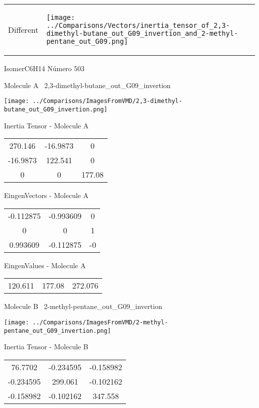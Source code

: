 \vtab[-5mm]
\begin{tabular}{*{2}{m{}}}
\begin{center}
\textcolor{NavyBlue}{\Large Different}
\end{center}
&
\begin{center}
\texttt{[image: ../Comparisons/Vectors/inertia\_tensor\_of\_2,3-dimethyl-butane\_out\_G09\_invertion\_and\_2-methyl-pentane\_out\_G09.png]}
\end{center}
\end{tabular}

 \newpage

\vtab[-3cm]
\begin{center}
{\large IsomerC6H14 \tab Número 503}
\end{center}
\begin{multicols}{2}
\begin{center}

Molecule A \
2,3-dimethyl-butane\_out\_G09\_invertion

\texttt{[image: ../Comparisons/ImagesFromVMD/2,3-dimethyl-butane\_out\_G09\_invertion.png]}

Inertia Tensor - Molecule A \\
\begin{tabular}{|c c c|}
270.146	 & 	-16.9873	 & 	0	 \\
-16.9873	 & 	122.541	 & 	0	 \\
0	 & 	0	 & 	177.08
\end{tabular}

\vtab
 EingenVectors - Molecule A     \\
\begin{tabular}{|c c c|}
-0.112875	 & 	-0.993609	 & 	0	 \\
0	 & 	0	 & 	1	 \\
0.993609	 & 	-0.112875	 & 	-0
\end{tabular}

\vtab
 EingenValues - Molecule A     \\
\begin{tabular}{|c c c|}
120.611	 & 	177.08	 & 	272.076	 \\
\end{tabular}
\columnbreak

Molecule B \
2-methyl-pentane\_out\_G09\_invertion

\texttt{[image: ../Comparisons/ImagesFromVMD/2-methyl-pentane\_out\_G09\_invertion.png]}

Inertia Tensor - Molecule B \\
\begin{tabular}{|c c c|}
76.7702	 & 	-0.234595	 & 	-0.158982	 \\
-0.234595	 & 	299.061	 & 	-0.102162	 \\
-0.158982	 & 	-0.102162	 & 	347.558
\end{tabular}


\end{center}
\end{multicols}
